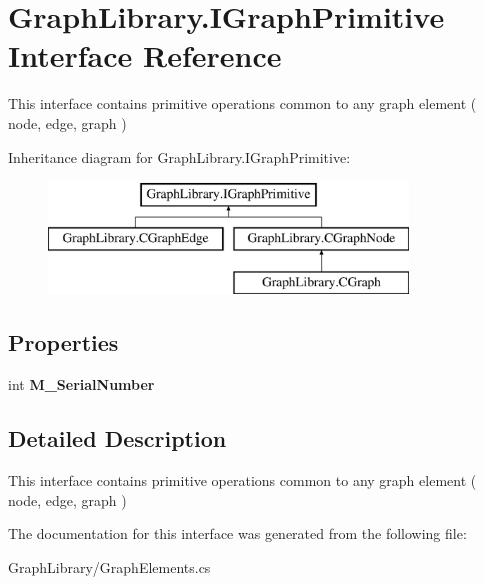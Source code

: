 \hypertarget{interface_graph_library_1_1_i_graph_primitive}{}\section{Graph\+Library.\+I\+Graph\+Primitive Interface Reference}
\label{interface_graph_library_1_1_i_graph_primitive}


This interface contains primitive operations common to any graph element ( node, edge, graph )  


Inheritance diagram for Graph\+Library.\+I\+Graph\+Primitive\+:\begin{figure}[H]
\begin{center}
\leavevmode
\includegraphics[height=3.000000cm]{interface_graph_library_1_1_i_graph_primitive}
\end{center}
\end{figure}
\subsection*{Properties}
\begin{DoxyCompactItemize}
\item 
\hypertarget{interface_graph_library_1_1_i_graph_primitive_a34c25a518def169597f90869a59e58f3}{}int {\bfseries M\+\_\+\+Serial\+Number}\label{interface_graph_library_1_1_i_graph_primitive_a34c25a518def169597f90869a59e58f3}

\end{DoxyCompactItemize}


\subsection{Detailed Description}
This interface contains primitive operations common to any graph element ( node, edge, graph ) 



The documentation for this interface was generated from the following file\+:\begin{DoxyCompactItemize}
\item 
Graph\+Library/Graph\+Elements.\+cs\end{DoxyCompactItemize}
